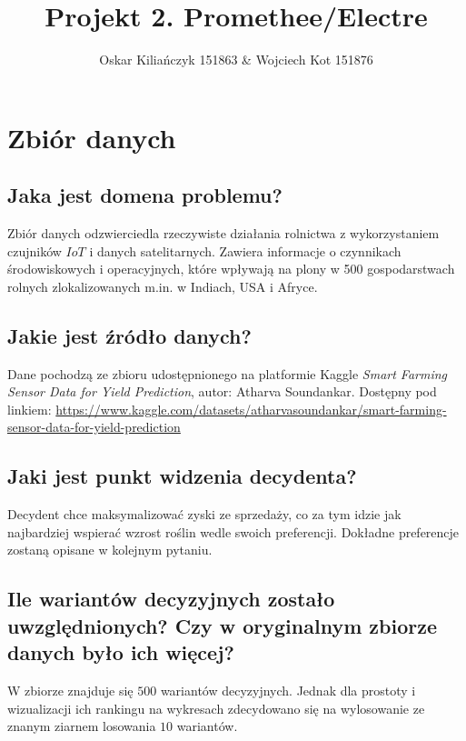 \documentclass[11pt]{article}
\title{Projekt 2. Promethee/Electre}
\author{Oskar Kiliańczyk 151863 \& Wojciech Kot 151876}
\date{}
\begin{document}
\maketitle
\newpage

\section{Zbiór danych}
\subsection{Jaka jest domena problemu?}
Zbiór danych odzwierciedla rzeczywiste działania rolnictwa z wykorzystaniem czujników $IoT$ i danych satelitarnych. Zawiera informacje o czynnikach środowiskowych i operacyjnych, które wpływają na plony w 500 gospodarstwach rolnych zlokalizowanych m.in. w Indiach, USA i Afryce.

\subsection{Jakie jest źródło danych?}
Dane pochodzą ze zbioru udostępnionego na platformie Kaggle \textit{Smart Farming Sensor Data for Yield Prediction}, autor: Atharva Soundankar. Dostępny pod linkiem: \url{https://www.kaggle.com/datasets/atharvasoundankar/smart-farming-sensor-data-for-yield-prediction}

\subsection{Jaki jest punkt widzenia decydenta?}
Decydent chce maksymalizować zyski ze sprzedaży, co za tym idzie jak najbardziej wspierać wzrost roślin wedle swoich preferencji. Dokładne preferencje zostaną opisane w kolejnym pytaniu.

\subsection{Ile wariantów decyzyjnych zostało uwzględnionych? Czy w oryginalnym zbiorze danych było ich więcej?}
W zbiorze znajduje się $500$ wariantów decyzyjnych. Jednak dla prostoty i wizualizacji ich rankingu na wykresach zdecydowano się na wylosowanie ze znanym ziarnem losowania $10$ wariantów.
\end{document}
